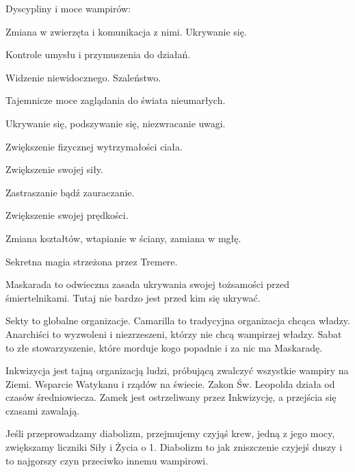 			Dyscypliny i moce wampirów:
			\begin{description}[noitemsep]
				\item[Animalizm] Zmiana w zwierzęta i komunikacja z nimi. Ukrywanie się.
				\item[Dominacja] Kontrole umysłu i przymuszenia do działań.
				\item[Nadwrażliwość] Widzenie niewidocznego. Szaleństwo.
				\item[Nekromancja] Tajemnicze moce zaglądania do świata nieumarłych.
				\item[Niewidoczność] Ukrywanie się, podszywanie się, niezwracanie uwagi.
				\item[Odporność] Zwiększenie fizycznej wytrzymałości ciała.
				\item[Potencja] Zwiększenie swojej siły.
				\item[Prezencja] Zastraszanie bądź zauraczanie.
				\item[Przyspieszenie] Zwiększenie swojej prędkości.
				\item[Transformacja] Zmiana kształtów, wtapianie w ściany, zamiana w mgłę.
				\item[Magia Krwi] Sekretna magia strzeżona przez Tremere.
			\end{description}
			
			Maskarada to odwieczna zasada ukrywania swojej tożsamości przed śmiertelnikami.
			Tutaj nie bardzo jest przed kim się ukrywać.
			
			Sekty to globalne organizacje. Camarilla to tradycyjna organizacja chcąca władzy. Anarchiści to wyzwoleni i niezrzeszeni, którzy nie chcą wampirzej władzy. Sabat to złe stowarzyszenie, które morduje kogo popadnie i za nic ma Maskaradę.

			Inkwizycja jest tajną organizacją ludzi, próbującą zwalczyć wszystkie wampiry na Ziemi.
			Wsparcie Watykanu i rządów na świecie.
			Zakon Św. Leopolda działa od czasów średniowiecza.
			Zamek jest ostrzeliwany przez Inkwizycję, a przejścia się czasami zawalają.
			
			Jeśli przeprowadzamy diabolizm, przejmujemy czyjąś krew, jedną z jego mocy, zwiększamy liczniki Siły i Życia o 1.
			Diabolizm to jak zniszczenie czyjejś duszy i to najgorszy czyn przeciwko innemu wampirowi.
			
